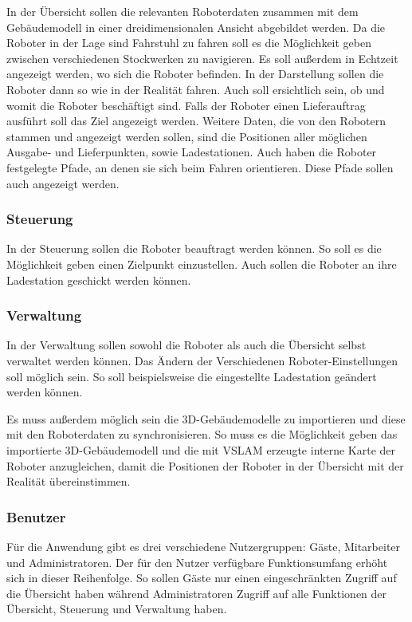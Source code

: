 In der Übersicht sollen die relevanten Roboterdaten zusammen mit dem Gebäudemodell in einer dreidimensionalen Ansicht abgebildet werden. Da die Roboter in der Lage sind Fahrstuhl zu fahren soll es die Möglichkeit geben zwischen verschiedenen Stockwerken zu navigieren. Es soll außerdem in Echtzeit angezeigt werden, wo sich die Roboter befinden. In der Darstellung sollen die Roboter dann so wie in der Realität fahren. Auch soll ersichtlich sein, ob und womit die Roboter beschäftigt sind. Falls der Roboter einen Lieferauftrag ausführt soll das Ziel angezeigt werden. Weitere Daten, die von den Robotern stammen und angezeigt werden sollen, sind die Positionen aller möglichen Ausgabe- und Lieferpunkten, sowie Ladestationen. Auch haben die Roboter festgelegte Pfade, an denen sie sich beim Fahren orientieren. Diese Pfade sollen auch angezeigt werden.

\subsubsection{Steuerung}

In der Steuerung sollen die Roboter beauftragt werden können. So soll es die Möglichkeit geben einen Zielpunkt einzustellen. Auch sollen die Roboter an ihre Ladestation geschickt werden können.

\subsubsection{Verwaltung}

In der Verwaltung sollen sowohl die Roboter als auch die Übersicht selbst verwaltet werden können. Das Ändern der Verschiedenen Roboter-Einstellungen soll möglich sein. So soll beispielsweise die eingestellte Ladestation geändert werden können.

Es muss außerdem möglich sein die 3D-Gebäudemodelle zu importieren und diese mit den Roboterdaten zu synchronisieren. So muss es die Möglichkeit geben das importierte 3D-Gebäudemodell und die mit \ac{VSLAM} erzeugte interne Karte der Roboter anzugleichen, damit die Positionen der Roboter in der Übersicht mit der Realität übereinstimmen.

\subsubsection{Benutzer}

Für die Anwendung gibt es drei verschiedene Nutzergruppen: Gäste, Mitarbeiter und Administratoren. Der für den Nutzer verfügbare Funktionsumfang erhöht sich in dieser Reihenfolge. So sollen Gäste nur einen eingeschränkten Zugriff auf die Übersicht haben während Administratoren Zugriff auf alle Funktionen der Übersicht, Steuerung und Verwaltung haben.

